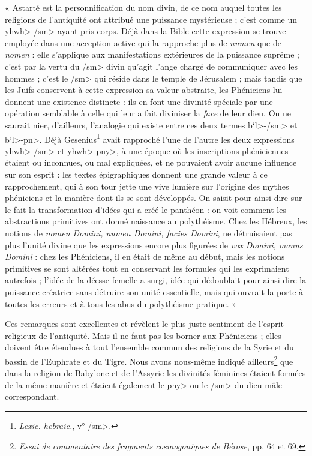 \documentclass[a4paper, 11pt, oneside, landscape]{article}
\begin{document}
« Astarté est la personnification du nom divin, de ce nom auquel toutes les religions de l'antiquité ont attribué une puissance mystérieuse ; c'est comme un \<yhwh>-\</sm> ayant pris corps. Déjà dans la Bible cette expression se trouve employée dans une acception active qui la rapproche plus de \emph{numen} que de \emph{nomen} : elle s'applique aux manifestations extérieures de la puissance suprême ; c'est par la vertu du \</sm> divin qu'agit l'ange chargé de communiquer avec les hommes ; c'est le \</sm> qui réside dans le temple de Jérusalem ; mais tandis que les Juifs conservent à cette expression sa valeur abstraite, les Phéniciens lui donnent une existence distincte : ils en font une divinité spéciale par une opération semblable à celle qui leur a fait diviniser la \emph{face} de leur dieu. On ne saurait nier, d'ailleurs, l'analogie qui existe entre ces deux termes \<b`l>-\</sm> et \<b`l>-\<pn>. Déjà Gesenius\footnote{\emph{Lexic. hebraic.}, v° \</sm>.} avait rapproché l'une de l'autre les deux expressions \<yhwh>-\</sm> et \<yhwh>-\<pny>, à une époque où les inscriptions phéniciennes étaient ou inconnues, ou mal expliquées, et ne pouvaient avoir aucune influence sur son esprit : les textes épigraphiques donnent une grande valeur à ce rapprochement, qui à son tour jette une vive lumière sur l'origine des mythes phéniciens et la manière dont ils se sont développés. On saisit pour ainsi dire sur le fait la transformation d'idées qui a créé le panthéon : on voit comment les abstractions primitives ont donné naissance au polythéisme. Chez les Hébreux, les notions de \emph{nomen Domini, numen Domini, facies Domini}, ne détruisaient pas plus l'unité divine que les expressions encore plus figurées de \emph{vox Domini, manus Domini} : chez les Phéniciens, il en était de même au début, mais les notions primitives se sont altérées tout en conservant les formules qui les exprimaient autrefois ; l'idée de la déesse femelle a surgi, idée qui dédoublait pour ainsi dire la puissance créatrice sans détruire son unité essentielle, mais qui ouvrait la porte à toutes les erreurs et à tous les abus du polythéisme pratique. »

Ces remarques sont excellentes et révèlent le plus juste sentiment de l'esprit religieux de l'antiquité. Mais il ne faut pas les borner aux Phéniciens ; elles doivent être étendues à tout l'ensemble commun des religions de la Syrie et du bassin de l'Euphrate et du Tigre. Nous avons nous-même indiqué ailleurs\footnote{\emph{Essai de commentaire des fragments cosmogoniques de Bérose}, pp. 64 et 69.} que dans la religion de Babylone et de l'Assyrie les divinités féminines étaient formées de la même manière et étaient également le \<pny> ou le \</sm> du dieu mâle correspondant.
\end{document}
